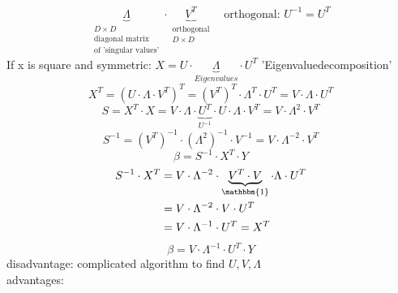 \documentclass[11pt]{article}
\begin{document}
\begin{enumerate}
\begin{equation*}
          \underbrace{\Lambda}_{\substack{D \times D \\ \text{diagonal matrix} \\
          \text{of 'singular values'}}} \cdot \underbrace{V^T}_{\substack{\text{orthogonal} \\ D \times D}}
          \quad \text{orthogonal: } U^{-1} = U^T
        \end{equation*}
        If x is square and symmetric: $X=U \cdot \underbrace{\Lambda}_{Eigenvalues} \cdot U^T$ 'Eigenvaluedecomposition'
        \begin{equation*}
          X^T = (U \cdot \Lambda \cdot V^T)^T = (V^T)^T\cdot\Lambda^T\cdot U^T = V\cdot\Lambda\cdot U^T
        \end{equation*}
        \begin{equation*}
          S = X^T \cdot X = V \cdot \Lambda \cdot \underbrace{U^T}_{U^{-1}} \cdot
          U \cdot \Lambda \cdot V^T = V \cdot \Lambda^2\cdot V^T
        \end{equation*}
        \begin{equation*}
          S^{-1} = (V^T)^{-1} \cdot (\Lambda^2)^{-1}\cdot V^{-1} = V \cdot
          \Lambda^{-2}\cdot V^T
        \end{equation*}
        \begin{equation*}
          \beta = S^{-1} \cdot X^T \cdot Y
        \end{equation*}
        \begin{equation*}
          \begin{align*}
            S^{-1}\cdot X^T &=V\cdot\Lambda^{-2}\cdot\underbrace{V^T\cdot V}_{\mathbbm{1}}
            \cdot\Lambda\cdot U^T \\
            &= V \cdot \Lambda^{-2} \cdot V \cdot U^T \\
            &= V \cdot \Lambda^{-1}\cdot U^T = X^T
          \end{align*}
        \end{equation*}
        \begin{equation*}
          \boxed{\beta = V\cdot\Lambda^{-1}\cdot U^T \cdot Y}
        \end{equation*}
        disadvantage: complicated algorithm to find $U, V, \Lambda$ \\
        advantages: 
\end{enumerate}
\end{document}
